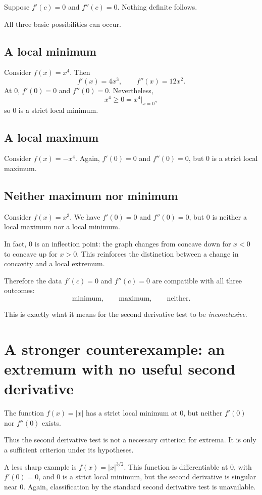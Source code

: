 \documentclass{essay}
\begin{document}
Suppose \(f'(c)=0\) and \(f''(c)=0\).
Nothing definite follows.

All three basic possibilities can occur.

\subsection{A local minimum}

Consider \(f(x)=x^4\).
Then
\[
f'(x)=4x^3,
\qquad
f''(x)=12x^2.
\]
At \(0\), \(f'(0)=0\) and \(f''(0)=0\).
Nevertheless,
\[
x^4\geq0=x^4\big|_{x=0},
\]
so \(0\) is a strict local minimum.

\subsection{A local maximum}

Consider \(f(x)=-x^4\). Again, \(f'(0)=0\) and \(f''(0)=0\), but \(0\) is a strict local maximum.

\subsection{Neither maximum nor minimum}

Consider \(f(x)=x^3\). We have \(f'(0)=0\) and \(f''(0)=0\), but \(0\) is neither a local maximum nor a local minimum.

In fact, \(0\) is an inflection point: the graph changes from concave down for \(x<0\) to concave up for \(x>0\). This reinforces the distinction between a change in concavity and a local extremum.

Therefore the data \(f'(c)=0\) and \(f''(c)=0\) are compatible with all three outcomes:
\[
\text{minimum},\qquad
\text{maximum},\qquad
\text{neither}.
\]

This is exactly what it means for the second derivative test to be \emph{inconclusive}.

\section{A stronger counterexample: an extremum with no useful second derivative}

The function \(f(x)=|x|\) has a strict local minimum at \(0\), but neither \(f'(0)\) nor \(f''(0)\) exists.

Thus the second derivative test is not a necessary criterion for extrema. It is only a sufficient criterion under its hypotheses.

A less sharp example is \(f(x)=|x|^{3/2}\). This function is differentiable at \(0\), with \(f'(0)=0\), and \(0\) is a strict local minimum, but the second derivative is singular near \(0\). Again, classification by the standard second derivative test is unavailable.
\end{document}
